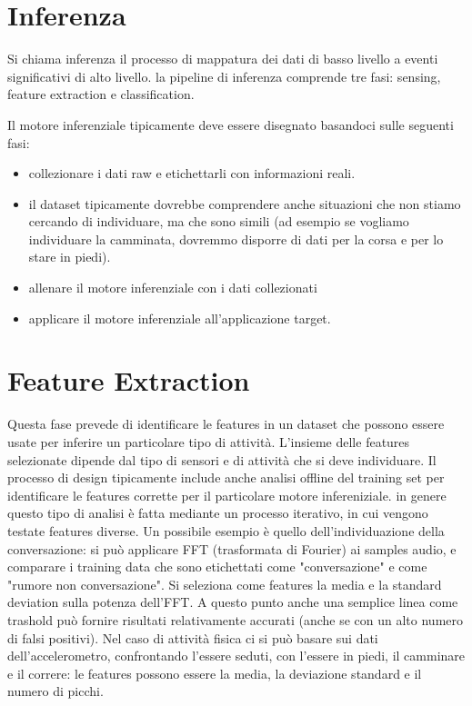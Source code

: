 \section{Inferenza}
Si chiama inferenza il processo di mappatura dei dati di basso livello a eventi 
significativi di alto livello.
la pipeline di inferenza comprende tre fasi: sensing, feature extraction e
classification.

Il motore inferenziale tipicamente deve essere disegnato basandoci sulle
seguenti fasi:
\begin{itemize}
\item collezionare i dati raw e etichettarli con informazioni reali.
\item il dataset tipicamente dovrebbe comprendere anche situazioni che non
stiamo cercando di individuare, ma che sono simili (ad esempio se vogliamo
individuare la camminata, dovremmo disporre di dati per la corsa e per lo stare
in piedi).
\item allenare il motore inferenziale con i dati collezionati
\item applicare il motore inferenziale all'applicazione target.
\end{itemize}

\section{Feature Extraction}
Questa fase prevede di identificare le features in un dataset che possono essere
usate per inferire un particolare tipo di attività.
L'insieme delle features selezionate dipende dal tipo di sensori e di attività
che si deve individuare. Il processo di design tipicamente include anche analisi
offline del training set per identificare le features corrette per il
particolare motore infereniziale. in genere questo tipo di analisi è fatta
mediante un processo iterativo, in cui vengono testate features diverse.
Un possibile esempio è quello dell'individuazione della conversazione: si può
applicare FFT (trasformata di Fourier) ai samples audio, e comparare i training
data che sono etichettati come "conversazione" e come "rumore non
conversazione". Si seleziona come features la media e la standard deviation
sulla potenza dell'FFT. A questo punto anche una semplice linea come trashold
può fornire risultati relativamente accurati (anche se con un alto numero di
falsi positivi).
Nel caso di attività fisica ci si può basare sui dati dell'accelerometro,
confrontando l'essere seduti, con l'essere in piedi, il camminare e il correre:
le features possono essere la media, la deviazione standard e il numero di
picchi.

